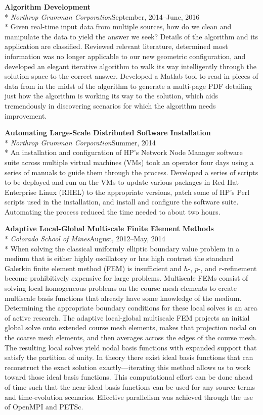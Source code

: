 \documentclass[margin,line,pifont,palatino,10pt]{res}
\begin{document}
\begin{resume}
{\bf Algorithm Development}\\*
{\it Northrop Grumman Corporation}\hfill September, 2014--June, 2016\\*
Given real-time input data from multiple sources, how do we clean and manipulate the data to yield the answer we seek?  Details of the algorithm and its application are classified.  Reviewed relevant literature, determined most information was no longer applicable to our new geometric configuration, and developed an elegant iterative algorithm to walk its way intelligently through the solution space to the correct answer.  Developed a Matlab tool to read in pieces of data from in the midst of the algorithm to generate a multi-page PDF detailing just how the algorithm is working its way to the solution, which aids tremendously in discovering scenarios for which the algorithm needs improvement.

{\bf Automating Large-Scale Distributed Software Installation}\\*
{\it Northrop Grumman Corporation}\hfill Summer, 2014\\*
An installation and configuration of HP's Network Node Manager software suite across multiple virtual machines (VMs) took an operator four days using a series of manuals to guide them through the process.  Developed a series of scripts to be deployed and run on the VMs to update various packages in Red Hat Enterprise Linux (RHEL) to the appropriate versions, patch some of HP's Perl scripts used in the installation, and install and configure the software suite.  Automating the process reduced the time needed to about two hours.

\pagebreak
{\bf Adaptive Local-Global Multiscale Finite Element Methods}\\*
{\it Colorado School of Mines}\hfill August, 2012--May, 2014\\*
When solving the classical uniformly elliptic boundary value problem in a medium that is either highly oscillatory or has high contrast the standard Galerkin finite element method (FEM) is insufficient and $h$-, $p$-, and $r$-refinement become prohibitively expensive for large problems.  Multiscale FEMs consist of solving local homogeneous problems on the course mesh elements to create multiscale basis functions that already have some knowledge of the medium.  Determining the appropriate boundary conditions for these local solves is an area of active research.  The adaptive local-global multiscale FEM projects an initial global solve onto extended course mesh elements, makes that projection nodal on the coarse mesh elements, and then averages across the edges of the course mesh.  The resulting local solves yield nodal basis functions with expanded support that satisfy the partition of unity.  In theory there exist ideal basis functions that can reconstruct the exact solution exactly---iterating this method allows us to work toward those ideal basis functions.  This computational effort can be done ahead of time such that the near-ideal basis functions can be used for any source terms and time-evolution scenarios.  Effective parallelism was achieved through the use of OpenMPI and PETSc.


\end{resume}
\end{document}
